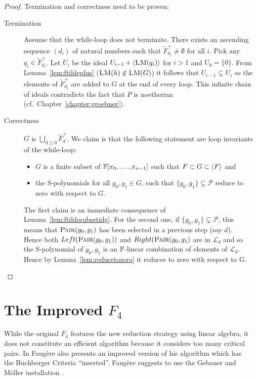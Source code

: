 \begin{proof} \cite[p.8]{f4}
Termination and correctness need to be proven:
\begin{description}
\item[Termination] Assume that the while-loop does not terminate. There exists an ascending sequence $(d_i)$ of natural numbers such that $\tilde{F}_{d_i}^+ \not= \emptyset$ for all $i$. Pick any $q_i \in \tilde{F}_{d_i}^+$.  Let $U_i$ be the ideal $U_{i-1} + \ideal{\LM(q_i)}$ for $i>1$ and $U_0 = \{0\}$. From Lemma~\ref{lem:ftildeplus} ($\textsc{LM}(h) \not\in \textsc{LM}(G)$) it follows that $U_{i-1} \subsetneq U_i$ as the elements of $\tilde{F}_{d_i}^+$ are added to $G$ at the end of every loop. This infinite chain of ideals contradicts the fact that $P$ is noetherian (cf.\ Chapter~\ref{chapter:groebner}).

\item[Correctness] $G$ is  $\bigcup_{d\geq 0} \tilde{F}_d^+$. We claim is that the following statement are loop invariants of the while-loop: 
\begin{itemize}
 \item $G$ is a finite subset of $\mathbb{F}[x_0,\dots,x_{n-1}]$ such that $F \subset G \subset \langle {F} \rangle$ and
 \item the S-polynomials for all $g_0,g_1 \in G$, such that $\{g_0,g_1\} \subsetneq \mathcal{P}$ reduce to zero with respect to $G$.
\end{itemize}
The first claim is an immediate consequence of Lemma~\ref{lem:ftildesubsetidg}. For the second one, if $\{g_0 , g_1\} \subsetneq \mathcal{P}$, this means that $\textsc{Pair}(g_0,g_1)$ has been selected in a previous step (say $d$). Hence both $Left(\textsc{Pair}(g_0,g_1))$ and $Right(\textsc{Pair}(g_0,g_1)$ are in $\mathcal{L}_d$ and so the S-polynomial of $g_0, g_1$ is an $\mathbb{F}$-linear combination of elements of $\mathcal{L}_d$. Hence by Lemma~\ref{lem:reducetozero} it reduces to zero with respect to G.
\end{description}
\end{proof}

\section{The Improved \texorpdfstring{$F_4$}{F4}}
While the original $F_{4}$ features the new reduction strategy using linear algebra, it does not constitute an efficient algorithm because it considers too many critical pairs. In \cite{f4} Faug\`ere also presents an improved version of his algorithm which has the  Buchberger Criteria ``inserted''. Faug\`ere suggests to use the Gebauer and Möller installation \cite{Gebauer1988}.


